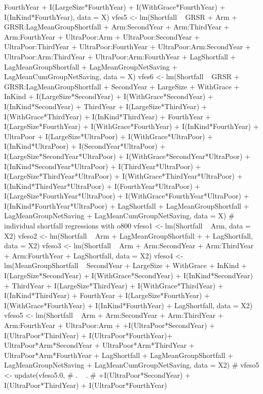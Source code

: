 \begin{Schunk}
\begin{Sinput}
  FourthYear +
  I(LargeSize*FourthYear) + I(WithGrace*FourthYear) + I(InKind*FourthYear),
  data = X)
vfes5 <- lm(Shortfall ~ 
  GRSR + Arm + GRSR:LagMeanGroupShortfall + 
  Arm:SecondYear + Arm:ThirdYear + Arm:FourthYear +
  UltraPoor:Arm + 
  UltraPoor:SecondYear + UltraPoor:ThirdYear + UltraPoor:FourthYear +
  UltraPoor:Arm:SecondYear + UltraPoor:Arm:ThirdYear + UltraPoor:Arm:FourthYear +
  LagShortfall + LagMeanGroupShortfall +
  LagMeanGroupNetSaving + LagMeanCumGroupNetSaving,
  data = X)
vfes6 <- lm(Shortfall ~ 
  GRSR + GRSR:LagMeanGroupShortfall + 
  SecondYear + LargeSize + WithGrace + InKind +
  I(LargeSize*SecondYear) + I(WithGrace*SecondYear) + I(InKind*SecondYear) + 
  ThirdYear +
  I(LargeSize*ThirdYear) + I(WithGrace*ThirdYear) + I(InKind*ThirdYear) +
  FourthYear +
  I(LargeSize*FourthYear) + I(WithGrace*FourthYear) + I(InKind*FourthYear) +
  UltraPoor + 
  I(LargeSize*UltraPoor) + I(WithGrace*UltraPoor) + I(InKind*UltraPoor) + 
  I(SecondYear*UltraPoor) +
  I(LargeSize*SecondYear*UltraPoor) + I(WithGrace*SecondYear*UltraPoor) + 
  I(InKind*SecondYear*UltraPoor) + 
  I(ThirdYear*UltraPoor) +
  I(LargeSize*ThirdYear*UltraPoor) + I(WithGrace*ThirdYear*UltraPoor) + 
  I(InKind*ThirdYear*UltraPoor) + 
  I(FourthYear*UltraPoor) +
  I(LargeSize*FourthYear*UltraPoor) + I(WithGrace*FourthYear*UltraPoor) + 
  I(InKind*FourthYear*UltraPoor) + 
  LagShortfall + LagMeanGroupShortfall +
  LagMeanGroupNetSaving + LagMeanCumGroupNetSaving,
  data = X)
# individual shortfall regressions with o800
vfeso1 <- lm(Shortfall  ~ Arm, data = X2)
vfeso2 <- lm(Shortfall  ~ 
   Arm + LagMeanGroupShortfall + 
  + LagShortfall, data = X2)
vfeso3 <- lm(Shortfall  ~ 
  Arm + Arm:SecondYear + Arm:ThirdYear + Arm:FourthYear
  + LagShortfall, 
  data = X2)
vfeso4 <- lm(MeanGroupShortfall ~  
  SecondYear + LargeSize + WithGrace + InKind +
  I(LargeSize*SecondYear) + I(WithGrace*SecondYear) + I(InKind*SecondYear) + 
  ThirdYear +
  I(LargeSize*ThirdYear) + I(WithGrace*ThirdYear) + I(InKind*ThirdYear) +
  FourthYear +
  I(LargeSize*FourthYear) + I(WithGrace*FourthYear) + I(InKind*FourthYear)
  + LagShortfall, 
  data = X2)
vfeso5 <- lm(Shortfall ~ 
  Arm + 
  Arm:SecondYear + Arm:ThirdYear + Arm:FourthYear +
  UltraPoor:Arm + 
  +I(UltraPoor*SecondYear) + I(UltraPoor*ThirdYear) + I(UltraPoor*FourthYear)+
  UltraPoor*Arm*SecondYear + UltraPoor*Arm*ThirdYear + UltraPoor*Arm*FourthYear +
  LagShortfall + LagMeanGroupShortfall +
  LagMeanGroupNetSaving + LagMeanCumGroupNetSaving,
  data = X2)
# vfeso5 <- update(vfeso5.0,
#   . ~ .
#   +I(UltraPoor*SecondYear) + I(UltraPoor*ThirdYear) + I(UltraPoor*FourthYear)

\end{Sinput}
\end{Schunk}

